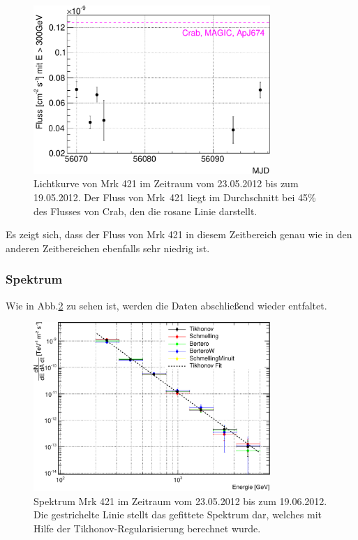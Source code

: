 \begin{figure}
    \centering
    \includegraphics[width=0.8\textwidth]{./Plots/04_MrkAnalyse/Datenset3/Datenset3_Mrk421_LC.pdf}
    \caption{Lichtkurve von Mrk 421 im Zeitraum vom 23.05.2012 bis zum 19.05.2012.
    Der Fluss von Mrk~421 liegt im Durchschnitt bei 45\% des Flusses von Crab, den die rosane Linie darstellt.}
    \label{Datenset3_LC_Mrk421}
\end{figure}

Es zeigt sich, dass der Fluss von Mrk 421 in diesem Zeitbereich genau wie in den anderen Zeitbereichen ebenfalls sehr niedrig ist.


\subsubsection{Spektrum}

Wie in Abb.\ref{Datenset3_Spektrum_Mrk421} zu sehen ist, werden die Daten abschließend wieder entfaltet.

\begin{figure}
    \centering
    \includegraphics[width=0.8\textwidth]{./Plots/04_MrkAnalyse/Datenset3/Datenset3_Mrk421_Spektrum.pdf}
    \caption{Spektrum Mrk 421 im Zeitraum vom 23.05.2012 bis zum 19.06.2012.
    Die gestrichelte Linie stellt das gefittete Spektrum dar, welches mit Hilfe der Tikhonov-Regularisierung berechnet wurde.}
    \label{Datenset3_Spektrum_Mrk421}
\end{figure}

